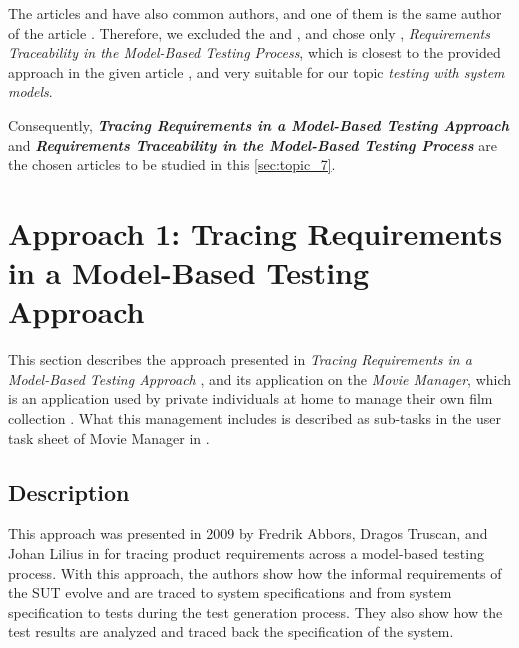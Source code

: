 The articles \cite{Relevant3} and \cite{Relevant4} have also common authors, and one of them is the same author of the article \cite{Paper2}. Therefore, we excluded the \cite{Relevant3} and \cite{Relevant4}, and chose only \cite{Paper2}, \textit{Requirements Traceability in the Model-Based Testing Process}, which is closest to the provided approach in the given article \cite{Paper1}, and very suitable for our topic \textit{testing with system models}.

Consequently, \textbf{\textit{Tracing Requirements in a Model-Based Testing Approach}} \cite{Paper1} and \textbf{\textit{Requirements Traceability in the Model-Based Testing Process}}  \cite{Paper2} are the chosen articles to be studied in this \autoref{sec:topic_7}.



\newpage
\section{Approach 1: Tracing Requirements in a Model-Based Testing Approach}
\label{sec:AP1}

This section describes the approach presented in \textit{Tracing Requirements in a Model-Based Testing Approach} \cite{Paper1}, and its application on the \textit{Movie Manager}, which is an application used by private individuals at home to manage their own film collection \cite{MovieManager}. What this management includes is described as sub-tasks in the user task sheet of Movie Manager in \cite{MovieManager}. 

\subsection{Description}
\label{subsec:DE1}
This approach was presented in 2009 by Fredrik Abbors, Dragos Truscan, and Johan Lilius in \cite{Paper1} for tracing product requirements across a model-based testing process. With this approach, the authors show how the informal requirements of the SUT evolve and are traced to system specifications and from system specification to tests during the test generation process. They also show how the test results are analyzed and traced back the specification of the system. 

